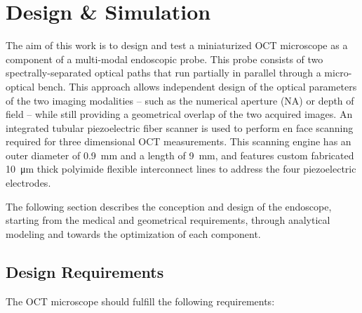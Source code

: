%

\chapter{Design \& Simulation}
\label{Ch:DesignSimulation}	

The aim of this work is to design and test a miniaturized OCT microscope as a component of a multi-modal endoscopic probe. This probe consists of two spectrally-separated optical paths that run partially in parallel through a micro-optical bench. This approach allows independent design of the optical parameters of the two imaging modalities -- such as the numerical aperture (NA) or depth of field -- while still providing a geometrical overlap of the two acquired images. An integrated tubular piezoelectric fiber scanner is used to perform en face scanning required for three dimensional OCT measurements. This scanning engine has an outer diameter of \SI{0.9}{\milli\meter} and a length of \SI{9}{\milli\meter}, and features custom fabricated \SI{10}{\micro\meter} thick polyimide flexible interconnect lines to address the four piezoelectric electrodes.

The following section describes the conception and design of the endoscope, starting from the medical and geometrical requirements, through analytical modeling and towards the optimization of each component.

\section{Design Requirements}



The OCT microscope should fulfill the following requirements:

